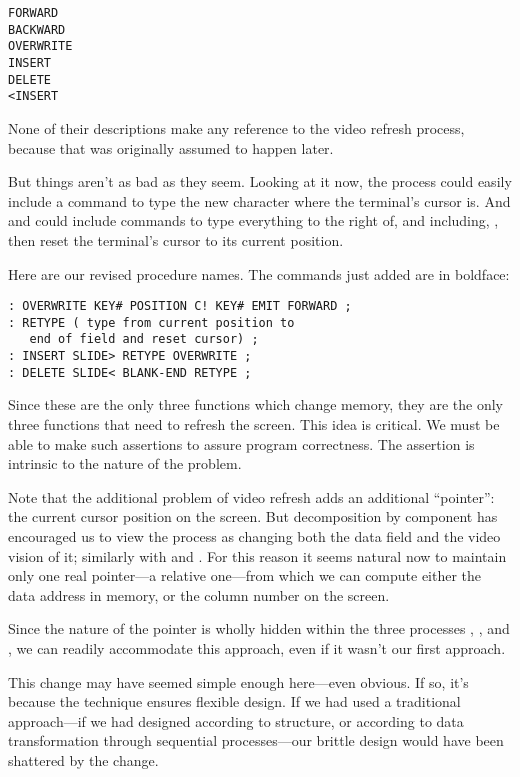 \begin{verbatim}
FORWARD
BACKWARD
OVERWRITE
INSERT
DELETE
<INSERT
\end{verbatim}

None of their descriptions make any reference to the video refresh
process, because that was originally assumed to happen later.

But things aren't as bad as they seem. Looking at it now, the process
 could easily include a command to type the new character
where the terminal's cursor is. And  and  could include
commands to type everything to the right of, and including, ,
then reset the terminal's cursor to its current position.

Here are our revised procedure names. The commands just added
are in boldface:

\begin{verbatim}
: OVERWRITE KEY# POSITION C! KEY# EMIT FORWARD ;
: RETYPE ( type from current position to
   end of field and reset cursor) ;
: INSERT SLIDE> RETYPE OVERWRITE ;
: DELETE SLIDE< BLANK-END RETYPE ;
\end{verbatim}

Since these are the only three functions which change memory, they are
the only three functions that need to refresh the screen. This idea is
critical. We must be able to make such assertions to assure program
correctness. The assertion is intrinsic to the nature of the problem.

Note that the additional problem of video refresh adds an additional
``pointer'': the current cursor position on the screen. But decomposition
by component has encouraged us to view the  process as
changing both the data field and the video vision of it; similarly with
 and . For this reason it seems natural now to maintain
only one real pointer---a relative one---from which we can compute either
the data address in memory, or the column number on the screen.

Since the nature of the pointer is wholly hidden within the three
processes , , and , we can readily accommodate
this approach, even if it wasn't our first approach.

This change may have seemed simple enough here---even obvious. If so,
it's because the technique ensures flexible design. If we had used a
traditional approach---if we had designed according to structure, or
according to data transformation through sequential processes---our
brittle design would have been shattered by the change.

